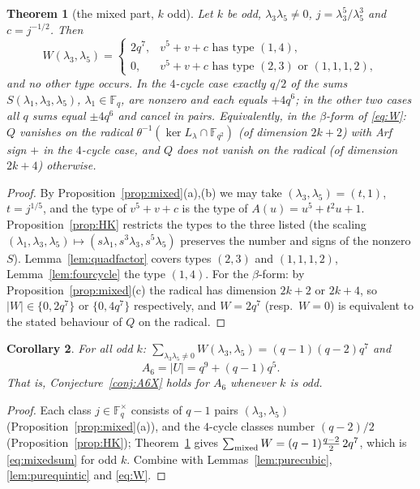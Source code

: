 \documentclass[11pt,a4paper]{amsart}
\newtheorem{theorem}{Theorem}[section]
\newtheorem{corollary}[theorem]{Corollary}
\theoremstyle{definition}
\newcommand{\F}{\mathbb{F}}
\begin{document}
\begin{theorem}[the mixed part, $k$ odd]\label{thm:mixed}
Let $k$ be odd, $\lambda_3\lambda_5\ne0$, $j=\lambda_3^5/\lambda_5^3$ and $c=j^{-1/2}$. Then
\[
W(\lambda_3,\lambda_5)=\begin{cases}2q^7,&v^5+v+c\text{ has type }(1,4),\\ 0,&v^5+v+c\text{ has type }(2,3)\text{ or }(1,1,1,2),\end{cases}
\]
and no other type occurs. In the $4$-cycle case exactly $q/2$ of the sums $S(\lambda_1,\lambda_3,\lambda_5)$, $\lambda_1\in\F_q$, are nonzero and each equals $+4q^6$; in the other two cases all $q$ sums equal $\pm4q^6$ and cancel in pairs. Equivalently, in the $\beta$-form of \eqref{eq:W}: $Q$ vanishes on the radical $\theta^{-1}(\ker L_\lambda\cap\F_{q^2})$ (of dimension $2k+2$) with Arf sign $+$ in the $4$-cycle case, and $Q$ does not vanish on the radical (of dimension $2k+4$) otherwise.
\end{theorem}
\begin{proof}
By Proposition~\ref{prop:mixed}(a),(b) we may take $(\lambda_3,\lambda_5)=(t,1)$, $t=j^{1/5}$, and the type of $v^5+v+c$ is the type of $A(u)=u^5+t^2u+1$. Proposition~\ref{prop:HK} restricts the types to the three listed (the scaling $(\lambda_1,\lambda_3,\lambda_5)\mapsto(s\lambda_1,s^3\lambda_3,s^5\lambda_5)$ preserves the number and signs of the nonzero $S$). Lemma~\ref{lem:quadfactor} covers types $(2,3)$ and $(1,1,1,2)$, Lemma~\ref{lem:fourcycle} the type $(1,4)$. For the $\beta$-form: by Proposition~\ref{prop:mixed}(c) the radical has dimension $2k+2$ or $2k+4$, so $|W|\in\{0,2q^7\}$ or $\{0,4q^7\}$ respectively, and $W=2q^7$ (resp.\ $W=0$) is equivalent to the stated behaviour of $Q$ on the radical.
\end{proof}

\begin{corollary}\label{cor:A6odd}
For all odd $k$: $\sum_{\lambda_3\lambda_5\ne0}W(\lambda_3,\lambda_5)=(q-1)(q-2)q^7$ and
\[
A_6=|U|=q^9+(q-1)q^5 .
\]
That is, Conjecture~\ref{conj:A6X} holds for $A_6$ whenever $k$ is odd.
\end{corollary}
\begin{proof}
Each class $j\in\F_q^\times$ consists of $q-1$ pairs $(\lambda_3,\lambda_5)$ (Proposition~\ref{prop:mixed}(a)), and the $4$-cycle classes number $(q-2)/2$ (Proposition~\ref{prop:HK}); Theorem~\ref{thm:mixed} gives $\sum_{\rm mixed}W=(q-1)\frac{q-2}2\,2q^7$, which is \eqref{eq:mixedsum} for odd $k$. Combine with Lemmas~\ref{lem:purecubic}, \ref{lem:purequintic} and \eqref{eq:W}.
\end{proof}
\end{document}
